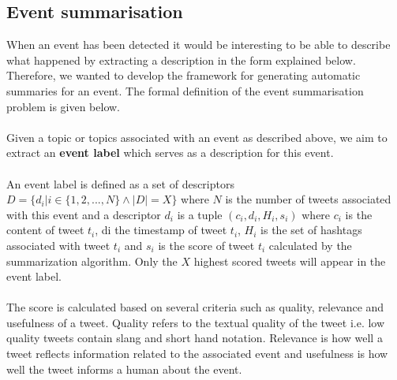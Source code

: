 \subsection{Event summarisation}\label{sec:EventSummarisation}
When an event has been detected it would be interesting to be able to describe what happened by extracting a description in the form explained below. Therefore, we wanted to develop the framework for generating automatic summaries for an event. The formal definition of the event summarisation problem is given below.\\\\
Given a topic or topics associated with an event as described above, we aim to extract an \textbf{event label} which serves as a description for this event.\\\\
An event label is defined as a set of descriptors $D = \{d_i | i\in\{1, 2,..., N\} \wedge |D| = X\}$ where $N$ is the number of tweets associated with this event and a descriptor $d_i$ is a tuple $(c_i, d_i, H_i, s_i)$ where $c_i$ is the content of tweet $t_i$,  di the timestamp of tweet $t_i$, $H_i$ is the set of hashtags associated with tweet $t_i$ and $s_i$ is the score of tweet $t_i$ calculated by the summarization algorithm. Only the $X$ highest scored tweets will appear in the event label.\\\\
The score is calculated based on several criteria such as quality, relevance and usefulness of a tweet. Quality refers to the textual quality of the tweet i.e. low quality tweets contain slang and short hand notation. Relevance is how well a tweet reflects information related to the associated event and usefulness is how well the tweet informs a human about the event.

